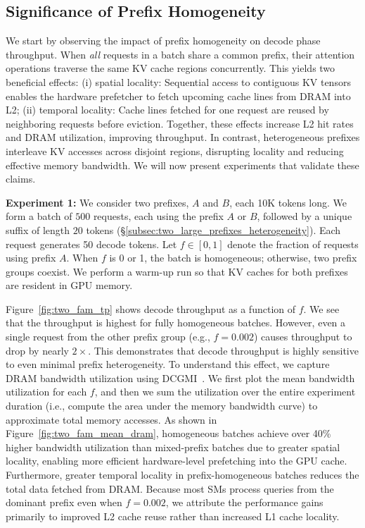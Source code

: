 \vspace{-8pt}

\subsection{Significance of Prefix Homogeneity}
\label{subsec:significance_of_prefix_homogeneity}
We start by observing the impact of prefix homogeneity on decode phase throughput. When \textit{all} requests in a batch share a common prefix, their attention operations traverse the same KV cache regions concurrently. This yields two beneficial effects: (i) spatial locality: Sequential access to contiguous KV tensors enables the hardware prefetcher to fetch upcoming cache lines from DRAM into L2; (ii) temporal locality: Cache lines fetched for one request are reused by neighboring requests before eviction. Together, these effects increase L2 hit rates and DRAM utilization, improving throughput. In contrast, heterogeneous prefixes interleave KV accesses across disjoint regions, disrupting locality and reducing effective memory bandwidth. We will now present experiments that validate these claims.

\textbf{Experiment 1:} We consider two prefixes, $A$ and $B$, each 10K tokens long. We form a batch of $500$ requests, each using the prefix $A$ or $B$, followed by a unique suffix of length $20$ tokens (\S\ref{subsec:two_large_prefixes_heterogeneity}). Each request generates 50 decode tokens. Let $f \in [0,1]$ denote the fraction of requests using prefix $A$. When $f$ is 0 or 1, the batch is homogeneous; otherwise, two prefix groups coexist. We perform a warm-up run so that KV caches for both prefixes are resident in GPU memory.

Figure~\ref{fig:two_fam_tp} shows decode throughput as a function of $f$. We see that the throughput is highest for fully homogeneous batches. However, even a single request from the other prefix group (e.g., $f = 0.002$) causes throughput to drop by nearly $2\times$. This demonstrates that decode throughput is highly sensitive to even minimal prefix heterogeneity. To understand this effect, we capture DRAM bandwidth utilization using DCGMI~\cite{nvidia_dcgm_2026}. We first plot the mean bandwidth utilization for each $f$, and then we sum the utilization over the entire experiment duration (i.e., compute the area under the memory bandwidth curve) to approximate total memory accesses. As shown in Figure~\ref{fig:two_fam_mean_dram}, homogeneous batches achieve over 40\% higher bandwidth utilization than mixed-prefix batches due to greater spatial locality, enabling more efficient hardware-level prefetching into the GPU cache. Furthermore, greater temporal locality in prefix-homogeneous batches reduces the total data fetched from DRAM. Because most SMs process queries from the dominant prefix even when $f = 0.002$, we attribute the performance gains primarily to improved L2 cache reuse rather than increased L1 cache locality. 

